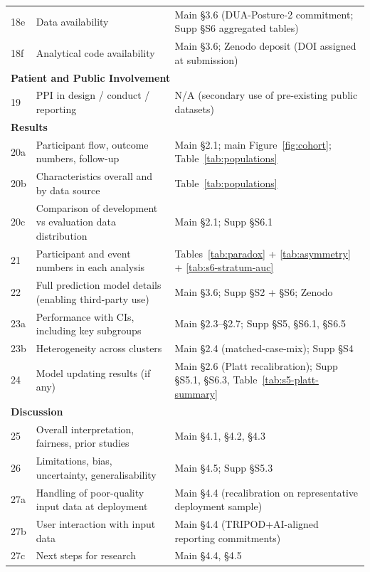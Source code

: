 \documentclass[11pt,a4paper]{article}
\begin{document}
\begin{longtable}{p{}p{}p{}}
18e & Data availability & Main §3.6 (DUA-Posture-2 commitment; Supp §S6 aggregated tables) \\
18f & Analytical code availability & Main §3.6; Zenodo deposit (DOI assigned at submission) \\
\midrule
\multicolumn{3}{l}{\textbf{Patient and Public Involvement}} \\
19  & PPI in design / conduct / reporting & N/A (secondary use of pre-existing public datasets) \\
\midrule
\multicolumn{3}{l}{\textbf{Results}} \\
20a & Participant flow, outcome numbers, follow-up & Main §2.1; main Figure~\ref{fig:cohort}; Table~\ref{tab:populations} \\
20b & Characteristics overall and by data source & Table~\ref{tab:populations} \\
20c & Comparison of development vs evaluation data distribution & Main §2.1; Supp §S6.1 \\
21  & Participant and event numbers in each analysis & Tables~\ref{tab:paradox} + \ref{tab:asymmetry} + \ref{tab:s6-stratum-auc} \\
22  & Full prediction model details (enabling third-party use) & Main §3.6; Supp §S2 + §S6; Zenodo \\
23a & Performance with CIs, including key subgroups & Main §2.3--§2.7; Supp §S5, §S6.1, §S6.5 \\
23b & Heterogeneity across clusters & Main §2.4 (matched-case-mix); Supp §S4 \\
24  & Model updating results (if any) & Main §2.6 (Platt recalibration); Supp §S5.1, §S6.3, Table~\ref{tab:s5-platt-summary} \\
\midrule
\multicolumn{3}{l}{\textbf{Discussion}} \\
25  & Overall interpretation, fairness, prior studies & Main §4.1, §4.2, §4.3 \\
26  & Limitations, bias, uncertainty, generalisability & Main §4.5; Supp §S5.3 \\
27a & Handling of poor-quality input data at deployment & Main §4.4 (recalibration on representative deployment sample) \\
27b & User interaction with input data & Main §4.4 (TRIPOD+AI-aligned reporting commitments) \\
27c & Next steps for research & Main §4.4, §4.5 \\
\end{longtable}




\end{document}
